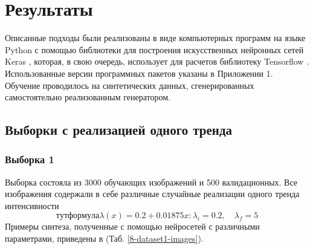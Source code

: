 \section{Результаты}
	Описанные подходы были реализованы в виде компьютерных программ на языке Python с помощью библиотеки для построения искусственных нейронных сетей Keras \cite{keras}, которая, в свою очередь, использует для расчетов библиотеку Tensorflow \cite{tf}. Использованные версии программных пакетов указаны в Приложении 1. Обучение проводилось на синтетических данных, сгенерированных самостоятельно реализованным генератором. 
	\subsection{Выборки с реализацией одного тренда}
		\subsubsection{Выборка 1}
			Выборка состояла из 3000 обучающих изображений и 500 валидационных. Все изображения содержали в себе различные случайные реализации одного тренда интенсивности
			$$тут формула \lambda(x) = 0.2 + 0.01875x : \lambda_i = 0.2, \quad \lambda_f = 5$$
			Примеры синтеза, полученные с помощью нейросетей с различными параметрами, приведены в (Таб. \ref{8-dataset1-images}).
